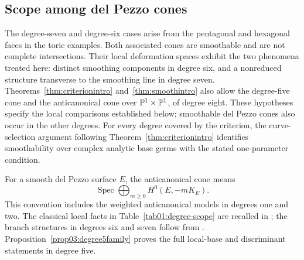 \subsection{Scope among del Pezzo cones}\label{sec01:degree-scope}

The degree-seven and degree-six cases arise from the pentagonal and
hexagonal faces in the toric examples.  Both associated cones are smoothable and are
not complete intersections.  Their local deformation spaces exhibit
the two phenomena treated here: distinct smoothing components in
degree six, and a nonreduced structure transverse to the smoothing
line in degree seven.  Theorems~\ref{thm:criterionintro}
and~\ref{thm:smoothintro} also allow the degree-five cone and the
anticanonical cone over $\mathbb{P}^1\times\mathbb{P}^1$, of degree eight.
These hypotheses specify the
local comparisons established below; smoothable del Pezzo cones also
occur in the other degrees.
For every degree covered by the criterion, the curve-selection argument
following Theorem~\ref{thm:criterionintro} identifies smoothability over
complex analytic base germs with the stated one-parameter condition.

For a smooth del Pezzo surface $E$, the anticanonical cone means
\[
 \operatorname{Spec}\bigoplus_{m\geq0}H^0(E,-mK_E).
\]
This convention includes the weighted
anticanonical models in degrees one and two.  The classical local
facts in Table~\ref{tab01:degree-scope} are recalled in
\cite[\S\S3.3, 5.5 and Example~2.19]{Gross97rev}; the branch structures
in degrees six and seven follow from \cite{Altmann97}.
Proposition~\ref{prop03:degree5family} proves the full local-base
and discriminant statements in degree five.

